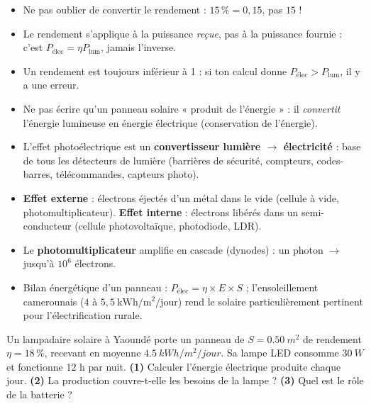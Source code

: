 \documentclass[11pt]{article}
\begin{document}
\begin{attention}
\begin{itemize}
\item Ne pas oublier de convertir le rendement : $15\,\% = 0{,}15$, pas $15$ !
\item Le rendement s'applique à la puissance \emph{reçue}, pas à la puissance fournie : c'est $P_{\text{élec}} = \eta P_{\text{lum}}$, jamais l'inverse.
\item Un rendement est toujours inférieur à 1 : si ton calcul donne $P_{\text{élec}} > P_{\text{lum}}$, il y a une erreur.
\item Ne pas écrire qu'un panneau solaire « produit de l'énergie » : il \emph{convertit} l'énergie lumineuse en énergie électrique (conservation de l'énergie).
\end{itemize}
\end{attention}

\begin{aretenir}
\begin{itemize}
\item L'effet photoélectrique est un \textbf{convertisseur lumière $\to$ électricité} : base de tous les détecteurs de lumière (barrières de sécurité, compteurs, codes-barres, télécommandes, capteurs photo).
\item \textbf{Effet externe} : électrons éjectés d'un métal dans le vide (cellule à vide, photomultiplicateur). \textbf{Effet interne} : électrons libérés dans un semi-conducteur (cellule photovoltaïque, photodiode, LDR).
\item Le \textbf{photomultiplicateur} amplifie en cascade (dynodes) : un photon $\to$ jusqu'à $10^6$ électrons.
\item Bilan énergétique d'un panneau : $P_{\text{élec}} = \eta \times E \times S$ ; l'ensoleillement camerounais ($4$ à $5{,}5\ \mathrm{kWh/m^2/jour}$) rend le solaire particulièrement pertinent pour l'électrification rurale.
\end{itemize}
\end{aretenir}

\begin{exercice}
Un lampadaire solaire à Yaoundé porte un panneau de $S = \SI{0,50}{m^2}$ de rendement $\eta = 18\,\%$, recevant en moyenne $\SI{4,5}{kWh/m^2/jour}$. Sa lampe LED consomme $\SI{30}{W}$ et fonctionne 12 h par nuit. \textbf{(1)} Calculer l'énergie électrique produite chaque jour. \textbf{(2)} La production couvre-t-elle les besoins de la lampe ? \textbf{(3)} Quel est le rôle de la batterie ?
\end{exercice}
\end{document}
